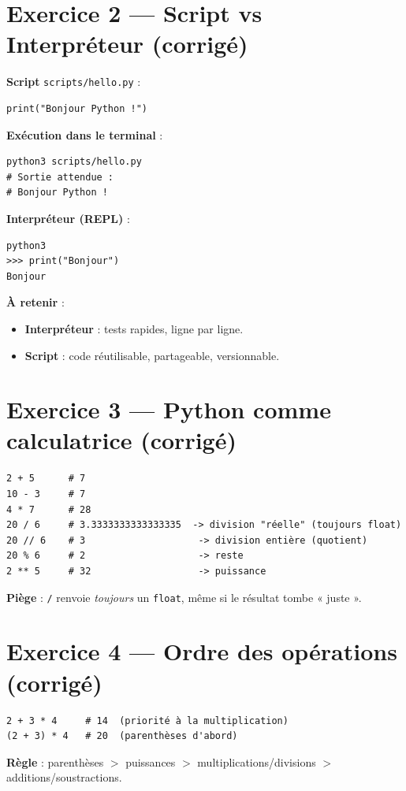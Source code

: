 \documentclass[11pt,a4paper]{article}
\begin{document}
\section*{Exercice 2 — Script vs Interpréteur (corrigé)}
\textbf{Script} \texttt{scripts/hello.py} :
\begin{lstlisting}
print("Bonjour Python !")
\end{lstlisting}
\textbf{Exécution dans le terminal} :
\begin{lstlisting}[language=terminal]
python3 scripts/hello.py
# Sortie attendue :
# Bonjour Python !
\end{lstlisting}
\textbf{Interpréteur (REPL)} :
\begin{lstlisting}[language=terminal]
python3
>>> print("Bonjour")
Bonjour
\end{lstlisting}
\textbf{À retenir} :
\begin{itemize}
  \item \textbf{Interpréteur} : tests rapides, ligne par ligne.
  \item \textbf{Script} : code réutilisable, partageable, versionnable.
\end{itemize}

\section*{Exercice 3 — Python comme calculatrice (corrigé)}
\begin{lstlisting}
2 + 5      # 7
10 - 3     # 7
4 * 7      # 28
20 / 6     # 3.3333333333333335  -> division "réelle" (toujours float)
20 // 6    # 3                    -> division entière (quotient)
20 % 6     # 2                    -> reste
2 ** 5     # 32                   -> puissance
\end{lstlisting}
\textbf{Piège} : \texttt{/} renvoie \emph{toujours} un \texttt{float}, même si le résultat tombe « juste ».

\section*{Exercice 4 — Ordre des opérations (corrigé)}
\begin{lstlisting}
2 + 3 * 4     # 14  (priorité à la multiplication)
(2 + 3) * 4   # 20  (parenthèses d'abord)
\end{lstlisting}
\textbf{Règle} : parenthèses $>$ puissances $>$ multiplications/divisions $>$ additions/soustractions.
\end{document}
